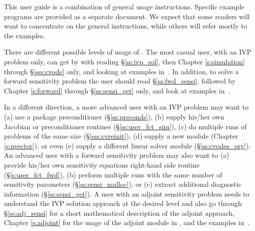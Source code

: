This user guide is a combination of general usage instructions.
Specific example programs are provided as a separate document.
We expect that some readers will want to concentrate on the general 
instructions, while others will refer mostly to the examples.

There are different possible levels of usage of {\cvodes}. The most casual
user, with an IVP problem only, can get by with reading \S\ref{ss:ivp_sol}, 
then  Chapter \ref{s:simulation} through \S\ref{sss:cvode} only, and looking
at examples in~\cite{cvodes_ex}.
In addition, to solve a forward sensitivity problem the user should read 
\S\ref{ss:fwd_sensi}, followed by Chapter \ref{s:forward} through 
\S\ref{ss:sensi_get} only, and look at examples in~\cite{cvodes_ex}.

In a different direction, a more advanced user with an IVP problem may want to 
(a) use a package preconditioner (\S\ref{ss:preconds}), 
(b) supply his/her own Jacobian or preconditioner routines (\S\ref{ss:user_fct_sim}),
(c) do multiple runs of problems of the same size (\S\ref{sss:cvreinit}), 
(d) supply a new {\nvector} module (Chapter \ref{s:nvector}), or even 
(e) supply a different linear solver module (\S\ref{ss:cvodes_org}).
%
An advanced user with a forward sensitivity problem may also want to
(a) provide his/her own sensitivity equations right-hand side routine
(\S\ref{s:user_fct_fwd}), (b) perform multiple runs with the same number of
sensitivity parameters (\S\ref{ss:sensi_malloc}), or (c) extract additional
diagnostic information (\S\ref{ss:sensi_get}).
%
A user with an adjoint sensitivity problem needs to understand the IVP 
solution approach at the desired level and also go through 
\S\ref{ss:adj_sensi} for a short mathematical description of the adjoint
approach, Chapter \ref{s:adjoint} for the usage of the adjoint module in {\cvodes},
and the examples in~\cite{cvodes_ex}.

